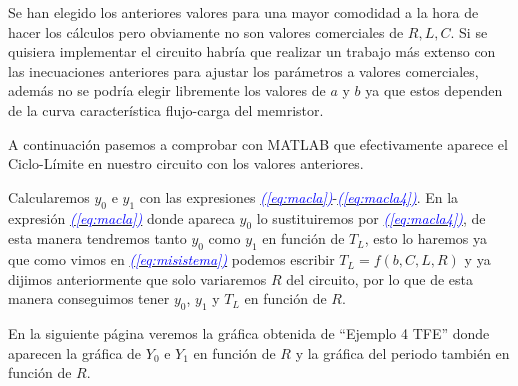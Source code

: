 \documentclass[12pt,a4paper]{report} %
\newcommand{\eref}[1]{\hyperref[#1]{\textcolor{blue}{\textit{(\ref*{#1})}}}}
\begin{document}
	\vspace{0.5cm}\noindent Se han elegido los anteriores valores para una mayor comodidad a la hora de hacer los cálculos pero obviamente no son valores comerciales de $R,L,C$. Si se quisiera implementar el circuito habría que realizar un trabajo más extenso con las inecuaciones anteriores para ajustar los parámetros a valores comerciales, además no se podría elegir libremente los valores de $a$ y $b$ ya que estos dependen de la curva característica flujo-carga del memristor.
	
	\vspace{0.5cm} A continuación pasemos a comprobar con MATLAB que efectivamente aparece el Ciclo-Límite en nuestro circuito con los valores anteriores.
	
	 \vspace{0.5cm}Calcularemos $y_0$ e $y_1$ con las expresiones \eref{eq:macla}-\eref{eq:macla4}. En la expresión \eref{eq:macla} donde apareca $y_0$ lo sustituiremos por \eref{eq:macla4}, de esta manera tendremos tanto $y_0$ como $y_1$ en función de $T_L$, esto lo haremos ya que como vimos en \eref{eq:misistema} podemos escribir $T_L=f(b,C,L,R)$ y ya dijimos anteriormente que solo variaremos $R$ del circuito, por lo que de esta manera conseguimos tener $y_0$, $y_1$ y $T_L$ en función de $R$.
	
	\newpage
	
	
	
	\newpage
	
	
	
	\vspace{1cm}\noindent En la siguiente página veremos la gráfica obtenida de ``Ejemplo 4 TFE'' donde aparecen la gráfica de $Y_0$ e $Y_1$ en función de $R$ y la gráfica del periodo también en función de $R$.

\newpage
\end{document}

